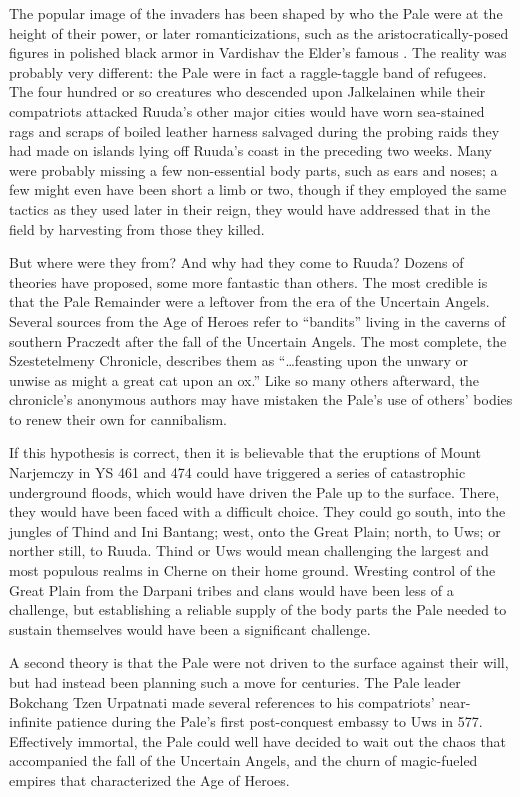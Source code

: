 \documentclass[12pt]{report}
\begin{document}
The popular image of the invaders has been shaped by who the Pale were
at the height of their power, or later romanticizations, such as the
aristocratically-posed figures in polished black armor in Vardishav
the Elder's famous .  The reality was
probably very different: the Pale were in fact a raggle-taggle band of
refugees.  The four hundred or so creatures who descended upon
Jalkelainen while their compatriots attacked Ruuda's other major
cities would have worn sea-stained rags and scraps of boiled leather
harness salvaged during the probing raids they had made on islands
lying off Ruuda's coast in the preceding two weeks.  Many were
probably missing a few non-essential body parts, such as ears and
noses; a few might even have been short a limb or two, though if they
employed the same tactics as they used later in their reign, they
would have addressed that in the field by harvesting from those they
killed.

But where were they from?  And why had they come to Ruuda?  Dozens of
theories have proposed, some more fantastic than others.  The most
credible is that the Pale Remainder were a leftover from the era of
the Uncertain Angels.  Several sources from the Age of Heroes refer to
``bandits'' living in the caverns of southern Praczedt after the fall of
the Uncertain Angels.  The most complete, the Szestetelmeny Chronicle,
describes them as ``{\ldots}feasting upon the unwary or unwise as might
a great cat upon an ox.''  Like so many others afterward, the
chronicle's anonymous authors may have mistaken the Pale's use of
others' bodies to renew their own for cannibalism.

If this hypothesis is correct, then it is believable that the
eruptions of Mount Narjemczy in YS 461 and 474 could have triggered a
series of catastrophic underground floods, which would have driven the
Pale up to the surface.  There, they would have been faced with a
difficult choice.  They could go south, into the jungles of Thind and
Ini Bantang; west, onto the Great Plain; north, to Uws; or norther
still, to Ruuda.  Thind or Uws would mean challenging the largest and
most populous realms in Cherne on their home ground.  Wresting control
of the Great Plain from the Darpani tribes and clans would have been
less of a challenge, but establishing a reliable supply of the body
parts the Pale needed to sustain themselves would have been a
significant challenge.

A second theory is that the Pale were not driven to the surface
against their will, but had instead been planning such a move for
centuries.  The Pale leader Bokchang Tzen Urpatnati made several
references to his compatriots' near-infinite patience during the
Pale's first post-conquest embassy to Uws in 577.  Effectively
immortal, the Pale could well have decided to wait out the chaos that
accompanied the fall of the Uncertain Angels, and the churn of
magic-fueled empires that characterized the Age of Heroes.
\end{document}
